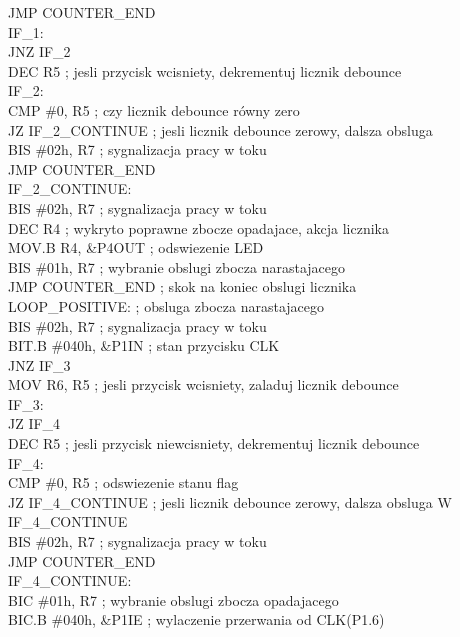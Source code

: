 \documentclass[a4paper,titlepage,11pt,floatssmall]{mwrep}
\begin{document}
	JMP COUNTER\_{}END\\
IF\_{}1:\\
	JNZ IF\_{}2\\
	DEC R5 		        	; jesli przycisk wcisniety, dekrementuj licznik debounce\\
IF\_{}2:\\
	CMP \#0, R5 				; czy licznik debounce równy zero\\
	JZ IF\_{}2\_{}CONTINUE        ; jesli licznik debounce zerowy, dalsza obsluga\\
    BIS \#02h, R7            ; sygnalizacja pracy w toku\\
	JMP COUNTER\_{}END\\
IF\_{}2\_{}CONTINUE:\\
    BIS \#02h, R7            ; sygnalizacja pracy w toku\\
	DEC R4		        	; wykryto poprawne zbocze opadajace, akcja licznika\\
	MOV.B R4, \&P4OUT		; odswiezenie LED\\
	BIS \#01h, R7            ; wybranie obslugi zbocza narastajacego\\
	JMP COUNTER\_{}END         ; skok na koniec obslugi licznika\\
LOOP\_{}POSITIVE:	            ; obsluga zbocza narastajacego\\
    BIS \#02h, R7            ; sygnalizacja pracy w toku\\
	BIT.B \#040h, \&P1IN		; stan przycisku CLK\\
	JNZ IF\_{}3\\
	MOV R6, R5 	        	; jesli przycisk wcisniety, zaladuj licznik debounce\\
IF\_{}3:\\
	JZ IF\_{}4\\
	DEC R5		        	; jesli przycisk niewcisniety, dekrementuj licznik debounce\\
IF\_{}4:\\
	CMP \#0, R5	        	; odswiezenie stanu flag\\
	JZ IF\_{}4\_{}CONTINUE        ; jesli licznik debounce zerowy, dalsza obsluga W IF\_{}4\_{}CONTINUE\\
    BIS \#02h, R7            ; sygnalizacja pracy w toku\\
	JMP COUNTER\_{}END\\
IF\_{}4\_{}CONTINUE:\\
	BIC \#01h, R7            ; wybranie obslugi zbocza opadajacego\\
    BIC.B \#040h, \&P1IE      ; wylaczenie przerwania od CLK(P1.6)\\
\end{document}
